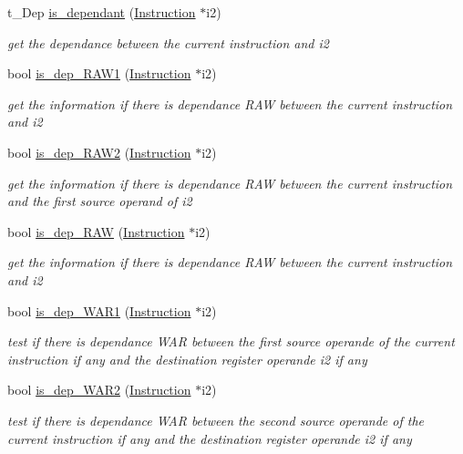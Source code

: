 \begin{DoxyCompactItemize}
\item 
t\-\_\-\-Dep \hyperlink{class_instruction_ac8d86b800140a08cb03d82f83f363fa4}{is\-\_\-dependant} (\hyperlink{class_instruction}{Instruction} $\ast$i2)
\begin{DoxyCompactList}\small\item\em get the dependance between the current instruction and i2 \end{DoxyCompactList}\item 
bool \hyperlink{class_instruction_ae5d54f535adab416c53eb0ff6a438804}{is\-\_\-dep\-\_\-\-R\-A\-W1} (\hyperlink{class_instruction}{Instruction} $\ast$i2)
\begin{DoxyCompactList}\small\item\em get the information if there is dependance R\-A\-W between the current instruction and i2 \end{DoxyCompactList}\item 
bool \hyperlink{class_instruction_aa28ae5f427ee02c96466f1ac68060f87}{is\-\_\-dep\-\_\-\-R\-A\-W2} (\hyperlink{class_instruction}{Instruction} $\ast$i2)
\begin{DoxyCompactList}\small\item\em get the information if there is dependance R\-A\-W between the current instruction and the first source operand of i2 \end{DoxyCompactList}\item 
bool \hyperlink{class_instruction_a4c902c5a8fdc8c8841ec24f389605fd5}{is\-\_\-dep\-\_\-\-R\-A\-W} (\hyperlink{class_instruction}{Instruction} $\ast$i2)
\begin{DoxyCompactList}\small\item\em get the information if there is dependance R\-A\-W between the current instruction and i2 \end{DoxyCompactList}\item 
bool \hyperlink{class_instruction_a36c0faedd74af14b403ba7063af5d07f}{is\-\_\-dep\-\_\-\-W\-A\-R1} (\hyperlink{class_instruction}{Instruction} $\ast$i2)
\begin{DoxyCompactList}\small\item\em test if there is dependance W\-A\-R between the first source operande of the current instruction if any and the destination register operande i2 if any \end{DoxyCompactList}\item 
bool \hyperlink{class_instruction_a04471df677984f67ec13de88f55e3703}{is\-\_\-dep\-\_\-\-W\-A\-R2} (\hyperlink{class_instruction}{Instruction} $\ast$i2)
\begin{DoxyCompactList}\small\item\em test if there is dependance W\-A\-R between the second source operande of the current instruction if any and the destination register operande i2 if any \end{DoxyCompactList}\item 

\end{DoxyCompactItemize}
